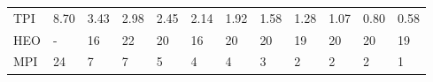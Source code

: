 \begin{table*}
{\begin{tabular}{llllllllllll}
TPI      &             8.70 &               3.43 &               2.98 &               2.45 &             2.14 &             1.92 &             1.58 &             1.28 &             1.07 &            0.80 &             0.58 \\
HEO      &                - &                 16 &                 22 &                 20 &               16 &               20 &               20 &               19 &               20 &              20 &               19 \\
MPI      &               24 &                  7 &                  7 &                  5 &                4 &                4 &                3 &                2 &                2 &               2 &                1 \\
\bottomrule
\end{tabular}}
\end{table*}



